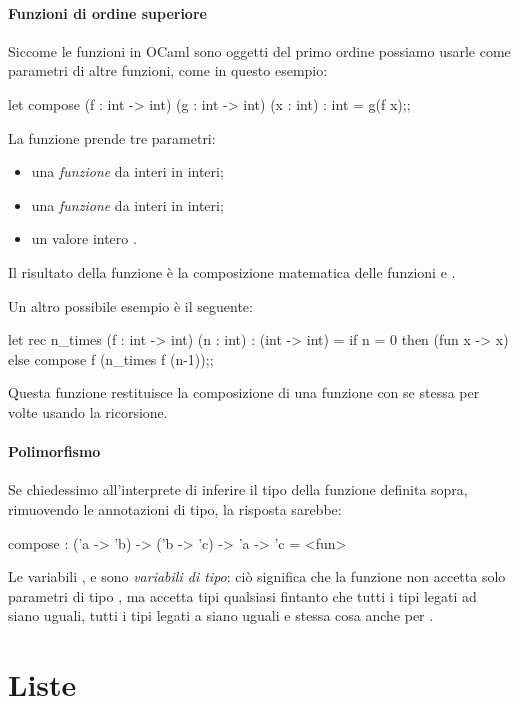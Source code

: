 \paragraph{Funzioni di ordine superiore} Siccome le funzioni in OCaml sono oggetti del primo ordine possiamo usarle come parametri di altre funzioni, come in questo esempio:
\begin{OCaml}
    let compose (f : int -> int) (g : int -> int) (x : int) : int =
        g(f x);;
\end{OCaml}
La funzione  prende tre parametri:
\begin{itemize}
    \item una \emph{funzione}  da interi in interi;
    \item una \emph{funzione}  da interi in interi;
    \item un valore intero .
\end{itemize} Il risultato della funzione  è la composizione matematica delle funzioni  e .

Un altro possibile esempio è il seguente:
\begin{OCaml}
    let rec n_times (f : int -> int) (n : int) : (int -> int) = 
        if n = 0 then (fun x -> x)
                 else compose f (n_times f (n-1));; 
\end{OCaml}
Questa funzione restituisce la composizione di una funzione  con se stessa per  volte usando la ricorsione.

\paragraph{Polimorfismo}
Se chiedessimo all'interprete di inferire il tipo della funzione  definita sopra, rimuovendo le annotazioni di tipo, la risposta sarebbe:
\begin{OCaml}
    compose : ('a -> 'b) -> ('b -> 'c) -> 'a -> 'c = <fun>
\end{OCaml}
Le variabili ,  e  sono \emph{variabili di tipo}: ciò significa che la funzione  non accetta solo parametri di tipo , ma accetta tipi qualsiasi fintanto che tutti i tipi legati ad  siano uguali, tutti i tipi legati a  siano uguali e stessa cosa anche per .

\section{Liste}

